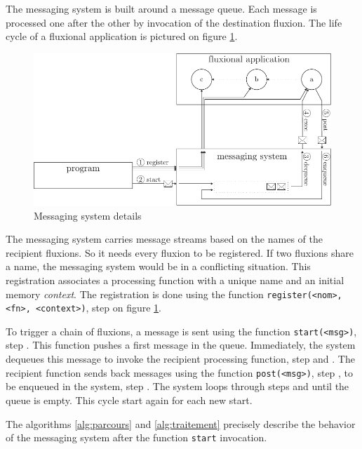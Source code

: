 The messaging system is built around a message queue.
Each message is processed one after the other by invocation of the destination fluxion.
The life cycle of a fluxional application is pictured on figure \ref{fig:MesSys}.

\begin{figure}[h!]
  \includegraphics[width=\linewidth]{ressources/schema-message.pdf}
  \caption{Messaging system details}
  \label{fig:MesSys}
\end{figure}

The messaging system carries message streams based on the names of the recipient fluxions.
So it needs every fluxion to be registered.
If two fluxions share a name, the messaging system would be in a conflicting situation.
This registration associates a processing function with a unique name and an initial memory \textit{context}.
The registration is done using the function \texttt{register(<nom>, <fn>, <context>)}, step  on figure \ref{fig:MesSys}.

To trigger a chain of fluxions, a message is sent using the function \texttt{start(<msg>)}, step .
This function pushes a first message in the queue.
Immediately, the system dequeues this message to invoke the recipient processing function, step  and .
The recipient function sends back messages using the function \texttt{post(<msg>)}, step , to be enqueued in the system, step .
The system loops through steps  and  until the queue is empty.
This cycle start again for each new start.

The algorithms \ref{alg:parcours} and \ref{alg:traitement} precisely describe the behavior of the messaging system after the function \texttt{start} invocation.

